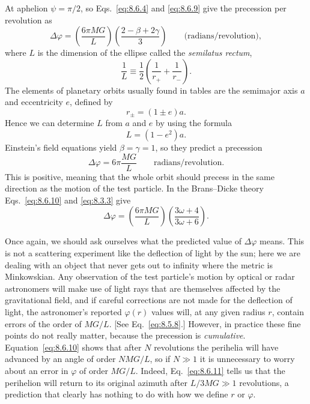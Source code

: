 At aphelion \(\psi=\pi/2\), so Eqs.~\eqref{eq:8.6.4} and
\eqref{eq:8.6.9} give the precession per revolution as
\begin{equation}
  \Delta\varphi
  =
  \left(\frac{6\pi MG}{L}\right)
  \left(\frac{2-\beta+2\gamma}{3}\right)
  \qquad\text{(radians/revolution)},
  \tag{8.6.10}\label{eq:8.6.10}
\end{equation}
where \(L\) is the dimension of the ellipse called the \emph{semilatus
rectum},
\[
  \frac1L
  \equiv
  \frac12\left(\frac1{r_+}+\frac1{r_-}\right).
\]
The elements of planetary orbits usually found in tables are the semimajor
axis \(a\) and eccentricity \(e\), defined by
\[
  r_\pm=(1\pm e)a.
\]
Hence we can determine \(L\) from \(a\) and \(e\) by using the formula
\[
  L=(1-e^2)a.
\]
Einstein's field equations yield \(\beta=\gamma=1\), so they predict a
precession
\begin{equation}
  \Delta\varphi
  =
  6\pi\frac{MG}{L}
  \qquad\text{radians/revolution}.
  \tag{8.6.11}\label{eq:8.6.11}
\end{equation}
This is positive, meaning that the whole orbit should precess in the same
direction as the motion of the test particle. In the Brans--Dicke theory
Eqs.~\eqref{eq:8.6.10} and \eqref{eq:8.3.3} give
\begin{equation}
  \Delta\varphi
  =
  \left(\frac{6\pi MG}{L}\right)
  \left(\frac{3\omega+4}{3\omega+6}\right).
  \tag{8.6.12}\label{eq:8.6.12}
\end{equation}

Once again, we should ask ourselves what the predicted value of
\(\Delta\varphi\) means. This is not a scattering experiment like the
deflection of light by the sun; here we are dealing with an object that
never gets out to infinity where the metric is Minkowskian. Any observation
of the test particle's motion by optical or radar astronomers will make use
of light rays that are themselves affected by the gravitational field, and
if careful corrections are not made for the deflection of light, the
astronomer's reported \(\varphi(r)\) values will, at any given radius \(r\),
contain errors of the order of \(MG/L\). [See Eq.~\eqref{eq:8.5.8}.]
However, in practice these fine points do not really matter, because the
precession is \emph{cumulative}. Equation~\eqref{eq:8.6.10} shows that
after \(N\) revolutions the perihelia will have advanced by an angle of
order \(NMG/L\), so if \(N\gg1\) it is unnecessary to worry about an error
in \(\varphi\) of order \(MG/L\). Indeed, Eq.~\eqref{eq:8.6.11} tells us
that the perihelion will return to its original azimuth after
\(L/3MG\gg1\) revolutions, a prediction that clearly has nothing to do with
how we define \(r\) or \(\varphi\).

